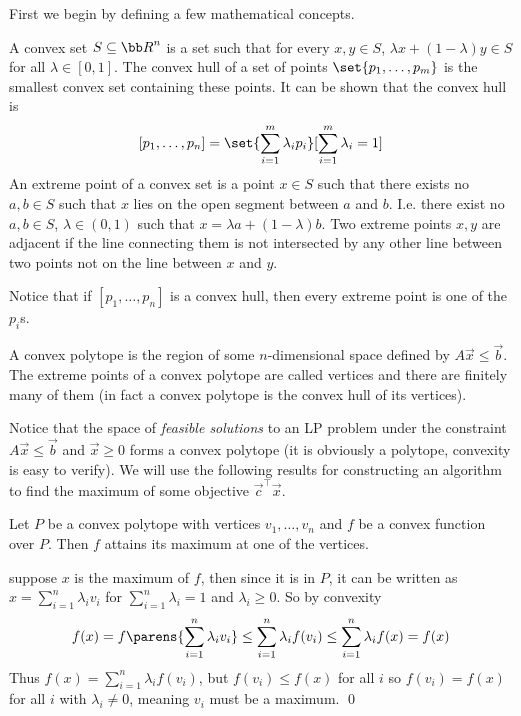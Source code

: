 First we begin by defining a few mathematical concepts.

\bdefn

    A {\emphcolor convex set} $S\subseteq{\bb R}^n$ is a set such that for every $x,y\in S$, $\lambda x+(1-\lambda)y\in S$ for all $\lambda\in[0,1]$.
    The {\emphcolor convex hull} of a set of points $\set{p_1,\dots,p_m}$ is the smallest convex set containing these points.
    It can be shown that the convex hull is
    $$ [p_1,\dots,p_n] = \set{\sum_{i=1}^m\lambda_ip_i}[\sum_{i=1}^m\lambda_i=1] $$
    An {\emphcolor extreme point} of a convex set is a point $x\in S$ such that there exists no $a,b\in S$ such that $x$ lies on the open segment between $a$ and $b$.
    I.e. there exist no $a,b\in S$, $\lambda\in(0,1)$ such that $x=\lambda a+(1-\lambda)b$.
    Two extreme points $x,y$ are {\emphcolor adjacent} if the line connecting them is not intersected by any other line between two points not on the line between $x$ and $y$.

\edefn

Notice that if $[p_1,\dots,p_n]$ is a convex hull, then every extreme point is one of the $p_i$s.

\bdefn

    A {\emphcolor convex polytope} is the region of some $n$-dimensional space defined by $A\vec x\leq\vec b$.
    The extreme points of a convex polytope are called {\emphcolor vertices} and there are finitely many of them (in fact a convex polytope is the convex hull of its vertices).

\edefn

Notice that the space of {\it feasible solutions} to an LP problem under the constraint $A\vec x\leq\vec b$ and $\vec x\geq0$ forms a convex polytope (it is obviously a polytope, convexity is easy to
verify).
We will use the following results for constructing an algorithm to find the maximum of some objective $\vec c^\top\vec x$.

\blemm

    Let $P$ be a convex polytope with vertices $v_1,\dots,v_n$ and $f$ be a convex function over $P$.
    Then $f$ attains its maximum at one of the vertices.

\elemm

\Proof suppose $x$ is the maximum of $f$, then since it is in $P$, it can be written as $x=\sum_{i=1}^n\lambda_iv_i$ for $\sum_{i=1}^n\lambda_i=1$ and $\lambda_i\geq0$.
So by convexity
$$ f(x) = f\parens{\sum_{i=1}^n\lambda_iv_i} \leq \sum_{i=1}^n\lambda_if(v_i) \leq \sum_{i=1}^n\lambda_if(x) = f(x) $$
Thus $f(x)=\sum_{i=1}^n\lambda_if(v_i)$, but $f(v_i)\leq f(x)$ for all $i$ so $f(v_i)=f(x)$ for all $i$ with $\lambda_i\neq0$, meaning $v_i$ must be a maximum.
\qed

